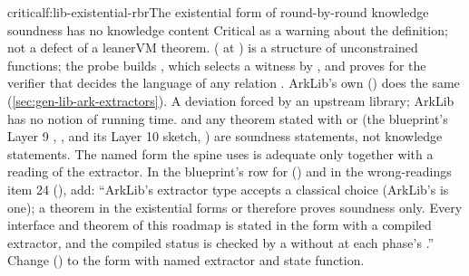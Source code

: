 \begin{finding}{critical}{f:lib-existential-rbr}{The existential form of round-by-round knowledge soundness has no knowledge content}
\textsf{Critical as a warning about the definition; not a defect of a leanerVM theorem.}
  (\allowbreak{} at
) is a structure of unconstrained functions; the probe  builds
, which selects a witness by , and proves
\allowbreak{}\allowbreak{} for the
verifier that decides the language of any relation . ArkLib's own
 () does the same (\cref{sec:gen-lib-ark-extractors}).
 A deviation forced by an upstream library; ArkLib has no notion of running
time.
 \allowbreak{}\allowbreak{} and any theorem stated
with  or  (the blueprint's
Layer 9 \allowbreak{},
, and its Layer 10 sketch, ) are soundness
statements, not knowledge statements. The named form the spine uses is adequate only together
with a reading of the extractor.
 In the blueprint's row for  () and
in the wrong-readings item 24 (), add: \enquote{ArkLib's extractor type accepts a
classical choice (ArkLib's  is one); a theorem in the existential forms
 or  therefore proves soundness
only. Every interface and theorem of this roadmap is stated in the  form with a compiled
extractor, and the compiled status is checked by a  without  at each
phase's .} Change \allowbreak{} () to the
 form with named extractor and state function.
\end{finding}

